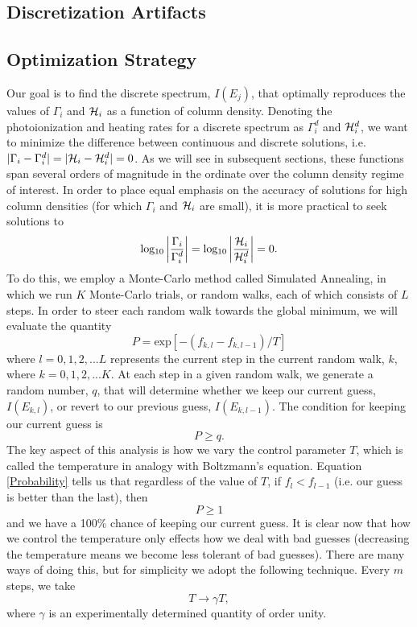 \documentclass[preprint2]{aastex}              %
\begin{document}
\subsection{Discretization Artifacts}


\subsection{Optimization Strategy}
Our goal is to find the discrete spectrum, $I(E_j)$, that optimally reproduces the values of $\Gamma_i$ and $\mathcal{H}_i$ as a function of column density.  Denoting the photoionization and heating rates for a discrete spectrum as $\Gamma_i^d$ and $\mathcal{H}_i^d$, we want to minimize the difference between continuous and discrete solutions, i.e. $|\Gamma_i - \Gamma_i^d| = |\mathcal{H}_i - \mathcal{H}_i^d| = 0$.  As we will see in subsequent sections, these functions span several orders of magnitude in the ordinate over the column density regime of interest.  In order to place equal emphasis on the accuracy of solutions for high column densities (for which $\Gamma_i$ and $\mathcal{H}_i$ are small), it is more practical to seek solutions to
\begin{equation}
    \mathrm{log_{10}}\left | \frac{\Gamma_i}{\Gamma_i^d}\right | = \mathrm{log_{10}}\left | \frac{\mathcal{H}_i}{\mathcal{H}_i^d}\right | = 0 .
\end{equation}    
To do this, we employ a Monte-Carlo method called Simulated Annealing, in which we run $K$ Monte-Carlo trials, or random walks, each of which consists of $L$ steps.  In order to steer each random walk towards the global minimum, we will evaluate the quantity  
\begin{equation}
    P = \mathrm{exp}\left[-(f_{k,l} - f_{k,l-1}) / T \right]  \label{Probability}
\end{equation}
where $l=0,1,2,...L$ represents the current step in the current random walk, $k$, where $k = 0,1,2,...K$.  At each step in a given random walk, we generate a random number, $q$, that will determine whether we keep our current guess, $I(E_{k,l})$, or revert to our previous guess, $I(E_{k,l-1})$.  The condition for keeping our current guess is
\begin{equation}
    P \ge q .
\end{equation}
The key aspect of this analysis is how we vary the control parameter $T$, which is called the temperature in analogy with Boltzmann's equation.  Equation \ref{Probability} tells us that regardless of the value of $T$, if $f_l < f_{l-1}$ (i.e. our guess is better than the last), then
\begin{equation}
    P \ge 1
\end{equation}
and we have a 100\% chance of keeping our current guess.  It is clear now that how we control the temperature only effects how we deal with bad guesses (decreasing the temperature means we become less tolerant of bad guesses).  There are many ways of doing this, but for simplicity we adopt the following technique.  Every $m$ steps, we take
\begin{equation}
    T \rightarrow \gamma T ,
\end{equation}
where $\gamma$ is an experimentally determined quantity of order unity.
\end{document}
